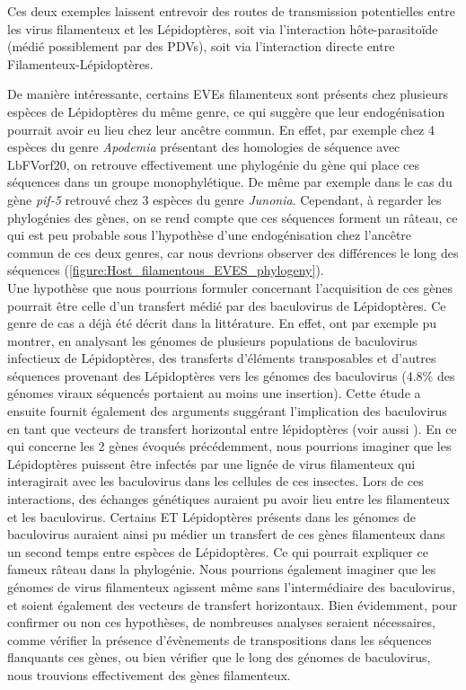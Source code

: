 Ces deux exemples laissent entrevoir des routes de transmission potentielles entre les virus filamenteux et les Lépidoptères, soit via l'interaction hôte-parasitoïde (médié possiblement par des PDVs), soit via l'interaction directe entre Filamenteux-Lépidoptères.

De manière intéressante, certains EVEs filamenteux sont présents chez plusieurs espèces de Lépidoptères du même genre, ce qui suggère que leur endogénisation pourrait avoir eu lieu chez leur ancêtre commun. En effet, par exemple chez 4 espèces du genre \textit{Apodemia} présentant des homologies de séquence avec LbFVorf20, on retrouve effectivement une phylogénie du gène qui place ces séquences dans un groupe monophylétique. De même par exemple dans le cas du gène \textit{pif-5} retrouvé chez 3 espèces du genre \textit{Junonia}. Cependant, à regarder les phylogénies des gènes, on se rend compte que ces séquences forment un râteau, ce qui est peu probable sous l'hypothèse d'une endogénisation chez l'ancêtre commun de ces deux genres, car nous devrions observer des différences le long des séquences (\figurename{\ref{figure:Host_filamentous_EVES_phylogeny}}).\\

Une hypothèse que nous pourrions formuler concernant l'acquisition de ces gènes pourrait être celle d'un transfert médié par des baculovirus de Lépidoptères. Ce genre de cas a déjà été décrit dans la littérature. En effet, \cite{gilbert_continuous_2016} ont par exemple pu montrer, en analysant les génomes de plusieurs populations de baculovirus infectieux de Lépidoptères, des transferts d'éléments transposables et d'autres séquences provenant des Lépidoptères vers les génomes des baculovirus (4.8\% des génomes viraux séquencés portaient au moins une insertion). Cette étude a ensuite fournit également des arguments suggérant l'implication des baculovirus en tant que vecteurs de transfert horizontal entre lépidoptères (voir aussi \citep{keeling_functional_2009,jehle_horizontal_1998,gilbert_population_2014}). En ce qui concerne les 2 gènes évoqués précédemment, nous pourrions imaginer que les Lépidoptères puissent être infectés par une lignée de virus filamenteux qui interagirait avec les baculovirus dans les cellules de ces insectes. Lors de ces interactions, des échanges génétiques auraient pu avoir lieu entre les filamenteux et les baculovirus. Certains ET Lépidoptères présents dans les génomes de baculovirus auraient ainsi pu médier un transfert de ces gènes filamenteux dans un second temps entre espèces  de Lépidoptères. Ce qui pourrait expliquer ce fameux râteau dans la phylogénie. Nous pourrions également imaginer que les génomes de virus filamenteux agissent même sans l'intermédiaire des baculovirus, et soient également des vecteurs de transfert horizontaux. Bien évidemment, pour confirmer ou non ces hypothèses, de nombreuses analyses seraient nécessaires, comme vérifier la présence d'évènements de transpositions dans les séquences flanquants ces gènes, ou bien vérifier que le long des génomes de baculovirus, nous trouvions effectivement des gènes filamenteux. 

